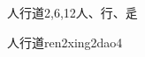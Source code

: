 \begin{entry}{人行道}{2,6,12}{⼈、⾏、⾡}
  \begin{phonetics}{人行道}{ren2xing2dao4}
  \end{phonetics}
\end{entry}
